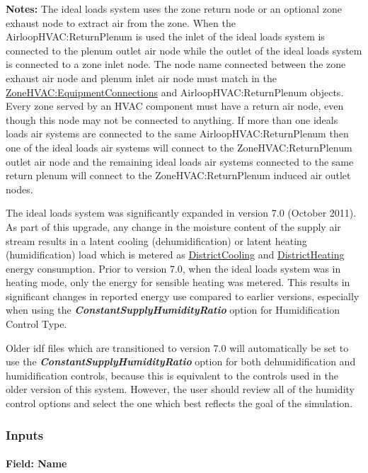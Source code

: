 \textbf{Notes:} The ideal loads system uses the zone return node or an optional zone exhaust node to extract air from the zone. When the AirloopHVAC:ReturnPlenum is used the inlet of the ideal loads system is connected to the plenum outlet air node while the outlet of the ideal loads system is connected to a zone inlet node. The node name connected between the zone exhaust air node and plenum inlet air node must match in the \hyperref[zonehvacequipmentconnections]{ZoneHVAC:EquipmentConnections} and AirloopHVAC:ReturnPlenum objects. Every zone served by an HVAC component must have a return air node, even though this node may not be connected to anything. If more than one ideals loads air systems are connected to the same AirloopHVAC:ReturnPlenum then one of the ideal loads air systems will connect to the ZoneHVAC:ReturnPlenum outlet air node and the remaining ideal loads air systems connected to the same return plenum will connect to the ZoneHVAC:ReturnPlenum induced air outlet nodes.

The ideal loads system was significantly expanded in version 7.0 (October 2011). As part of this upgrade, any change in the moisture content of the supply air stream results in a latent cooling (dehumidification) or latent heating (humidification) load which is metered as \hyperref[districtcooling]{DistrictCooling} and \hyperref[districtheating]{DistrictHeating} energy consumption. Prior to version 7.0, when the ideal loads system was in heating mode, only the energy for sensible heating was metered. This results in significant changes in reported energy use compared to earlier versions, especially when using the \textbf{\emph{ConstantSupplyHumidityRatio}} option for Humidification Control Type.

Older idf files which are transitioned to version 7.0 will automatically be set to use the \textbf{\emph{ConstantSupplyHumidityRatio}} option for both dehumidification and humidification controls, because this is equivalent to the controls used in the older version of this system. However, the user should review all of the humidity control options and select the one which best reflects the goal of the simulation.

\subsubsection{Inputs}\label{inputs-056}

\paragraph{Field: Name}\label{field-name-054}

